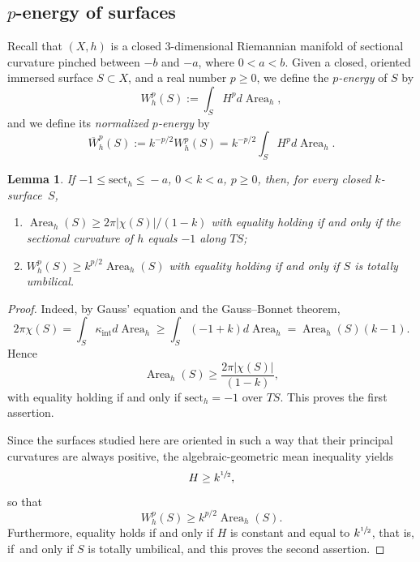 \documentclass[JEP,XML,SOM,Unicode,NoEqCountersInSection,published]{cedram}
\newcommand{\ksurface}{$k$\nobreakdash-surface\xspace}
\newcommand{\intt}{\mathrm{int}}
\theoremstyle{plain}
\newtheorem{lemma}[theorem]{Lemma}
\theoremstyle{definition}
\let\dans\subset
\newcommand{\sect}{\mathrm{sect}}
\DeclareMathOperator{\Area}{Area}
\begin{document}
\subsection{$p$-energy of surfaces} Recall that $(X,h)$ is a closed $3$\nobreakdash-dimensional Riemannian manifold of sectional curvature pinched between $-b$ and $-a$, where $0<a<b$. Given a closed, oriented immersed surface $S\dans X$, and a real number $p\geq 0$, we define the \emph{$p$-energy} of $S$ by
\begin{equation*}
W_h^{p}(S):=\int_S H^p d\Area_h,
\end{equation*}
and we define its \emph{normalized $p$-energy} by
\begin{equation*}
\overline{W}_h^{p}(S):=k^{-p/2}W_h^p(S)=k^{-p/2}\int_S H^p d\Area_h.
\end{equation*}

\begin{lemma}\label{lem_lower_bounds_energy}
If $-1\!\leq\!\sect_h\!\leq\! -a$, $0\!<\!k\!<\!a$, $p\!\geq\!0$, then, for every closed \ksurface~$S$,
\begin{enumerate}
\item $\Area_h(S)\geq 2\pi|\chi(S)|/(1-k)$ with equality holding if and only if the sectional curvature of $h$ equals $-1$ along $TS$;
\item $W_h^{p}(S)\geq k^{p/2}\Area_h(S)$ with equality holding if and only if $S$ is totally umbilical.
\end{enumerate}
\end{lemma}

\begin{proof}
Indeed, by Gauss' equation and the Gauss--Bonnet theorem,
\begin{equation*}
2 \pi \chi(S) = \int_{S} \kappa_{\intt}d\Area_h \geq \int_{S} (-1 + k)d\Area_h=\Area_h(S) (k-1).
\end{equation*}
Hence
\begin{equation*}
\Area_h(S) \geq \frac{2\pi\left|\chi(S)\right|}{(1-k)},
\end{equation*}
with equality holding if and only if $\sect_h=-1$ over $TS$. This proves the first assertion.

Since the surfaces studied here are oriented in such a way that their principal curvatures are always positive, the algebraic-geometric mean inequality yields
\begin{equation*}
H\geq k^{\sfrac{1}{2}},
\end{equation*}
so that
\begin{equation*}
W_h^p(S) \geq k^{p/2}\Area_h(S).
\end{equation*}
Furthermore, equality holds if and only if $H$ is constant and equal to $k^{\sfrac{1}{2}}$, that is, if~and only if $S$ is totally umbilical, and this proves the second assertion.
\end{proof}
\end{document}
